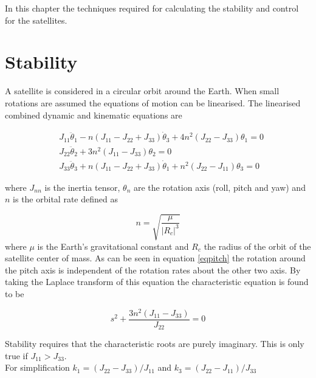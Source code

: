 In this chapter the techniques required for calculating the stability and control for the satellites.

\section{Stability}
A satellite is considered in a circular orbit around the Earth. When small rotations are assumed the equations of motion can be linearised. The linearised combined dynamic and kinematic equations are

\begin{eqnarray}
&J_{11} \ddot{\theta}_1 - n\left(J_{11}-J_{22}+J_{33}\right) \dot{\theta}_3+ 4n^2\left(J_{22}-J_{33}\right)\theta _1= 0 \label{eqroll} \\
&J_{22} \ddot{\theta}_2 + 3n^2\left(J_{11}-J_{33}\right)\theta_2= 0 \label{eqpitch} \\
&J_{33} \ddot{\theta}_3 + n\left(J_{11}-J_{22}+J_{33}\right) \dot{\theta}_1 + n^2\left(J_{22}-J_{11}\right)\theta _3= 0 \label{eqyaw}
\end{eqnarray}

where $J_{nn}$ is the inertia tensor, $\theta_n$ are the rotation axis (roll, pitch and yaw) and $n$ is the orbital rate defined as 

\begin{equation}
n=\sqrt{\frac{\mu}{|R_c|^3}}
\label{orbrate}
\end{equation}
where $\mu$ is the Earth's gravitational constant and $R_c$ the radius of the orbit of the satellite center of mass. As can be seen in equation \ref{eqpitch} the rotation around the pitch axis is independent of the rotation rates about the other two axis. By taking the Laplace transform of this equation the characteristic equation is found to be

\begin{equation}
s^2+\frac{3n^2\left(J_{11}-J_{33}\right)}{J_{22}} = 0 
\label{lappitch}
\end{equation}

Stability requires that the characteristic roots are purely imaginary. This is only true if $J_{11}>J_{33}$.\\
For simplification $k_1 = (J_{22}-J_{33})/J_{11}$ and $k_3 = (J_{22}-J_{11})/J_{33}$